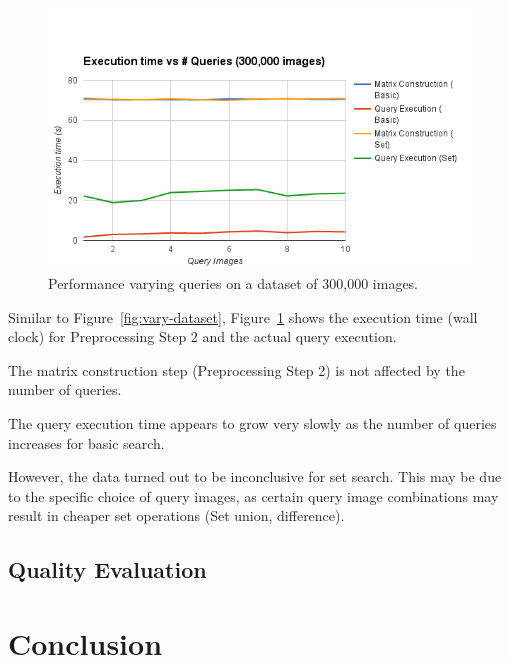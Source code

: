 \begin{figure}[t]
    \begin{minipage}{1.0\columnwidth}
        \centering
        \includegraphics[width=0.9\columnwidth]{figs/vary-queries}
    \end{minipage}
    \caption{Performance varying queries on a dataset of 300,000 images.}
    \label{fig:vary-queries}
\end{figure}

Similar to Figure~\ref{fig:vary-dataset}, Figure~\ref{fig:vary-queries} shows the execution time (wall clock) for Preprocessing Step 2 and the actual query execution.

The matrix construction step (Preprocessing Step 2) is not affected by the number of queries.

The query execution time appears to grow very slowly as the number of queries increases for basic search.

However, the data turned out to be inconclusive for set search. This may be due to the specific choice of query images, as
certain query image combinations may result in cheaper set operations (Set union, difference).
\subsection{Quality Evaluation}

\section{Conclusion}
